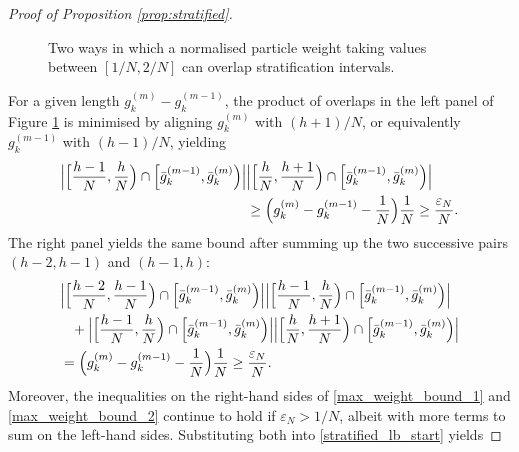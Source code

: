 \documentclass[a4paper,11pt]{article}
\theoremstyle{definition}
\begin{document}
\begin{proof}[Proof of Proposition \ref{prop:stratified}]
\begin{figure}[!ht]
\caption{Two ways in which a normalised particle weight taking values between $[1/N, 2/N]$ can overlap stratification intervals.}
\label{fig:max_weight}
\end{figure}
\noindent
For a given length $g_k^{(m)} - g_k^{(m - 1)}$, the product of overlaps in the left panel of Figure \ref{fig:max_weight} is minimised by aligning $g_k^{(m)}$ with $(h + 1) / N$, or equivalently $g_k^{(m - 1)}$ with $(h - 1) / N$, yielding
\begin{align}
\Big| \Big[ \frac{ h - 1 }{ N }, \frac{ h }{ N } \Big) \cap \Big[ \bar{ g }_k^{ ( m - 1 ) }, \bar{ g }_k^{ ( m ) } \Big) \Big| &\Big| \Big[ \frac{ h }{ N }, \frac{ h + 1 }{ N } \Big) \cap \Big[ \bar{ g }_k^{ ( m - 1 ) }, \bar{ g }_k^{ ( m ) } \Big) \Big| \notag \\
&\geq \Big(g_k^{(m)} - g_k^{(m - 1)} - \frac{1}{N}\Big) \frac{1}{N} \geq \frac{\varepsilon_N}{N}. \label{max_weight_bound_1}
\end{align}
The right panel yields the same bound after summing up the two successive pairs $(h - 2, h - 1)$ and $(h - 1, h)$:
\begin{align}
&\Big| \Big[ \frac{ h - 2 }{ N }, \frac{ h - 1 }{ N } \Big) \cap \Big[ \bar{ g }_k^{ ( m - 1 ) }, \bar{ g }_k^{ ( m ) } \Big) \Big| \Big| \Big[ \frac{ h - 1 }{ N }, \frac{ h }{ N } \Big) \cap \Big[ \bar{ g }_k^{ ( m - 1 ) }, \bar{ g }_k^{ ( m ) } \Big) \Big| \notag \\
&\phantom{\geq}+ \Big| \Big[ \frac{ h - 1 }{ N }, \frac{ h }{ N } \Big) \cap \Big[ \bar{ g }_k^{ ( m - 1 ) }, \bar{ g }_k^{ ( m ) } \Big) \Big| \Big| \Big[ \frac{ h }{ N }, \frac{ h + 1 }{ N } \Big) \cap \Big[ \bar{ g }_k^{ ( m - 1 ) }, \bar{ g }_k^{ ( m ) } \Big) \Big| \notag \\
&= \Big(g_k^{(m)} - g_k^{(m - 1)} - \frac{1}{N}\Big) \frac{1}{N} \geq \frac{\varepsilon_N}{N}. \label{max_weight_bound_2}
\end{align}
Moreover, the inequalities on the right-hand sides of \eqref{max_weight_bound_1} and \eqref{max_weight_bound_2} continue to hold if $\varepsilon_N > 1/N$, albeit with more terms to sum on the left-hand sides.
Substituting both into \eqref{stratified_lb_start} yields

\end{proof}
\end{document}
